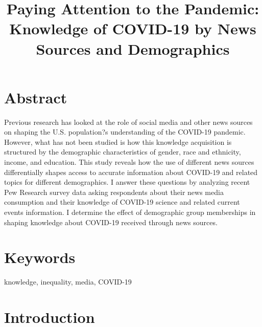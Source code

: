 \documentclass[11pt]{article}
\begin{document}
\title{Paying Attention to the Pandemic: \\ Knowledge of COVID-19 by News Sources and Demographics}

\author{} 
\date{}

\clearpage\maketitle

\section{Abstract}\label{sec:abstract}
\pagestyle{fancy} %
\setcounter{page}{1} %

Previous research has looked at the role of social media and other news sources on shaping the U.S. population?s understanding of the COVID-19 pandemic. However, what has not been studied is how this knowledge acquisition is structured by the demographic characteristics of gender, race and ethnicity, income, and education. This study reveals how the use of different news sources differentially shapes access to accurate information about COVID-19 and related topics for different demographics. I answer these questions by analyzing recent Pew Research survey data asking respondents about their news media consumption and their knowledge of COVID-19 science and related current events information. I determine the effect of demographic group memberships in shaping knowledge about COVID-19 received through news sources.
 
\section{Keywords}

knowledge, inequality, media, COVID-19

\newpage

\section{Introduction}\label{sec:introduction}
\end{document}
